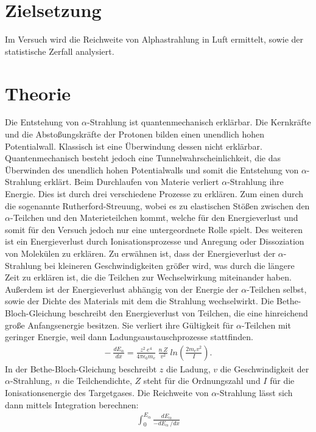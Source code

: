 \section{Zielsetzung}
Im Versuch wird die Reichweite von Alphastrahlung in Luft ermittelt, sowie der statistische Zerfall analysiert.

\section{Theorie}
Die Entstehung von $\alpha$-Strahlung ist quantenmechanisch erklärbar. Die Kernkräfte und die Abstoßungskräfte der Protonen bilden einen unendlich
hohen Potentialwall. Klassisch ist eine Überwindung dessen nicht erklärbar. Quantenmechanisch besteht jedoch eine Tunnelwahrscheinlichkeit, die
das Überwinden des unendlich hohen Potentialwalls und somit die Entstehung von $\alpha$-Strahlung erklärt.
Beim Durchlaufen von Materie verliert $\alpha$-Strahlung ihre Energie. Dies ist durch drei verschiedene Prozesse zu erklären.
Zum einen durch die sogenannte Rutherford-Streuung, wobei es zu elastischen Stößen zwischen den $\alpha$-Teilchen und den Materieteilchen
kommt, welche für den Energieverlust und somit für den Versuch jedoch nur eine untergeordnete Rolle spielt.
Des weiteren ist ein Energieverlust durch Ionisationsprozesse und Anregung oder Dissoziation von Molekülen zu erklären.
Zu erwähnen ist, dass der Energieverlust der $\alpha$-Strahlung bei kleineren Geschwindigkeiten größer wird, was durch die längere
Zeit zu erklären ist, die die Teilchen zur Wechselwirkung miteinander haben. Außerdem ist der Energieverlust abhängig von der Energie der
$\alpha$-Teilchen selbst, sowie der Dichte des Materials mit dem die Strahlung wechselwirkt.
Die Bethe-Bloch-Gleichung beschreibt den Energieverlust von Teilchen, die eine hinreichend große Anfangsenergie besitzen. Sie verliert ihre
Gültigkeit für $\alpha$-Teilchen mit geringer Energie, weil dann Ladungsaustauschprozesse stattfinden.
\FloatBarrier
\begin{align*}
  - ~\frac{dE_\alpha}{dx} = \frac{z^2~e^4}{4\pi\epsilon_0 m_e}~\frac{n ~ Z}{v^2}~ln\left(\frac{2 m_e v^2}{I}\right) .
\end{align*}
\FloatBarrier
In der Bethe-Bloch-Gleichung beschreibt $z$ die Ladung, $v$ die Geschwindigkeit der $\alpha$-Strahlung, $n$ die Teilchendichte, $Z$ steht für die
Ordnungszahl und $I$ für die Ionisationsenergie des Targetgases.
Die Reichweite von $\alpha$-Strahlung lässt sich dann mittels Integration berechnen:
\FloatBarrier
\begin{align*}
  \int_{0}^{E_{\alpha}} \frac{dE_\alpha}{-dE_\alpha ~ / dx}
\end{align*}
